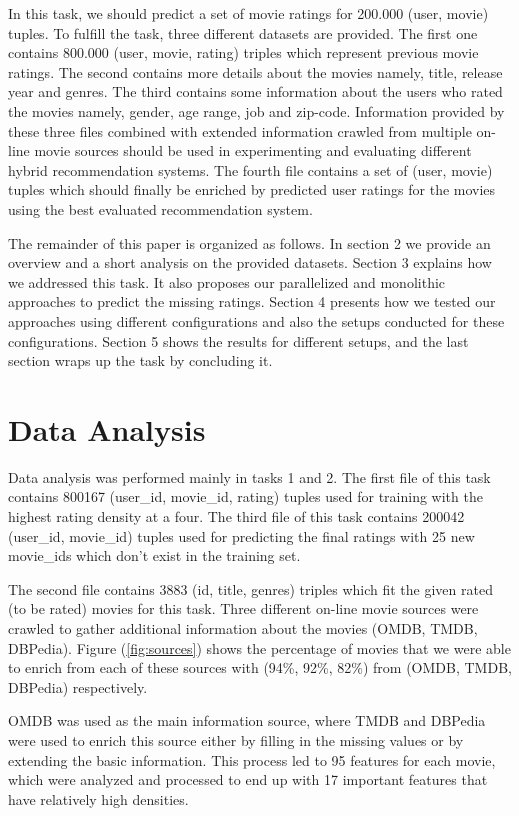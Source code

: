 \documentclass{sigish}
\begin{document}
In this task, we should predict a set of movie ratings for 200.000 (user, movie) tuples. To fulfill the task, three different datasets are provided. The first one contains 800.000 (user, movie, rating) triples which represent previous movie ratings. The second contains more details about the movies namely, title, release year and genres. The third contains some information about the users who rated the movies namely, gender, age range, job and zip-code. Information provided by these three files combined with extended information crawled from multiple on-line movie sources should be used in experimenting and evaluating different hybrid recommendation systems. The fourth file contains a set of (user, movie) tuples which should finally be enriched by predicted user ratings for the movies using the best evaluated recommendation system.

The remainder of this paper is organized as follows. In section 2 we provide an overview and a short analysis on the provided datasets. Section 3 explains how we addressed this task. It also proposes our parallelized and monolithic approaches to predict the missing ratings. Section 4 presents how we tested our approaches using different configurations and also the setups conducted for these configurations. Section 5 shows the results for different setups, and the last section wraps up the task by concluding it.

\section{Data Analysis}

Data analysis was performed mainly in tasks 1 and 2. The first file of this task contains 800167 (user\_id, movie\_id, rating) tuples used for training with the highest rating density at a four. The third file of this task contains 200042 (user\_id, movie\_id) tuples used for predicting the final ratings with 25 new movie\_ids which don't exist in the training set.

The second file contains 3883 (id, title, genres) triples which fit the given rated (to be rated) movies for this task. Three different on-line movie sources were crawled to gather additional information about the movies (OMDB, TMDB, DBPedia). Figure (\ref{fig:sources}) shows the percentage of movies that we were able to enrich from each of these sources with (94\%, 92\%, 82\%) from (OMDB, TMDB, DBPedia) respectively.

OMDB was used as the main information source, where TMDB and DBPedia were used to enrich this source either by filling in the missing values or by extending the basic information. This process led to 95 features for each movie, which were analyzed and processed to end up with 17 important features that have relatively high densities.
\end{document}
